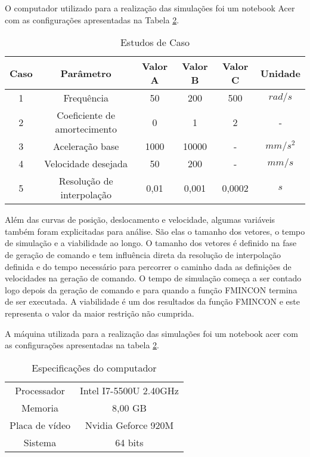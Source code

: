 O computador utilizado para a realização das simulações foi um notebook Acer com as configurações apresentadas na Tabela
\ref{tab:note_config}.

\begin{table}
    \begin{center}
    \caption{Estudos de Caso}
    \label{tab:sim_params}
    \begin{tabular}{c c c c c c}
        Caso & Parâmetro & Valor A & Valor B & Valor C & Unidade\\ \hline
        1 & Frequência & 50 & 200 & 500 & $rad/s$\\
        2 & Coeficiente de amortecimento & 0 & 1 & 2 & - \\
        3 & Aceleração base & 1000 & 10000 & - & $mm/s^2$ \\
        4 & Velocidade desejada & 50 & 200 & - & $mm/s$ \\
        5 & Resolução de interpolação & 0,01 & 0,001 & 0,0002 & $s$ \\ \hline
    \end{tabular}
    \end{center}
\end{table}

Além das curvas de posição, deslocamento e velocidade, algumas variáveis também foram explicitadas para análise. São elas o tamanho dos vetores, o tempo de simulação e a viabilidade ao longo. O tamanho dos vetores é definido na fase de geração de comando e tem influência direta da resolução de interpolação definida e do tempo necessário para percorrer o caminho dada as definições de velocidades na geração de comando. O tempo de simulação começa a ser contado logo depois da geração de comando e para quando a função FMINCON termina de ser executada. A viabilidade é um dos resultados da função FMINCON e este representa o valor da maior restrição não cumprida.

A máquina utilizada para a realização das simulações foi um notebook acer com as configurações apresentadas na tabela
\ref{tab:note_config}.

\begin{table}
    \begin{center}
    \caption{Especificações do computador}
    \label{tab:note_config}
    \begin{tabular}{c c}
        \hline
        Processador & Intel I7-5500U 2.40GHz \\
        Memoria & 8,00 GB \\
        Placa de vídeo & Nvidia Geforce 920M \\
        Sistema & 64 bits \\ \hline
    \end{tabular}
    \end{center}
\end{table}

